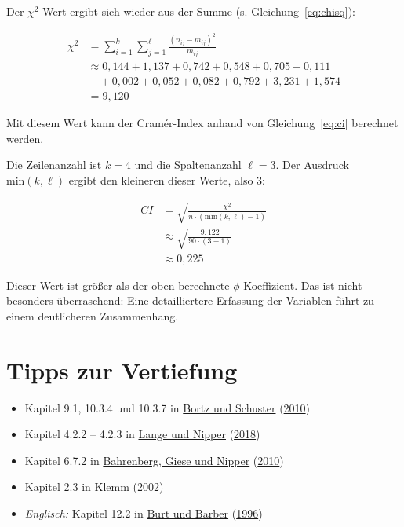 \documentclass[
  11pt,
  ngerman,
  a4paper,
]{report}
\providecommand{\tightlist}{%
  \setlength{\itemsep}{0pt}\setlength{\parskip}{0pt}}
\begin{document}
Der \(\chi^2\)-Wert ergibt sich wieder aus der Summe (s. Gleichung~\eqref{eq:chisq}):

\nopagebreak

\[
\begin{aligned}
\chi^2&= \sum_{i=1}^{k}\sum_{j=1}^{\ell}\frac{(n_{ij}-m_{ij})^{2}}{m_{ij}}\\[4pt]
&\approx 0{,}144+1{,}137+0{,}742+0{,}548+0{,}705+0{,}111\\&\quad+0{,}002+0{,}052+0{,}082+0{,}792+3{,}231+1{,}574 \\
& =9{,}120
\end{aligned}
\]

Mit diesem Wert kann der Cramér-Index anhand von Gleichung~\eqref{eq:ci} berechnet werden.

Die Zeilenanzahl ist \(k=4\) und die Spaltenanzahl \(\ell=3\). Der Ausdruck \(\mathrm{min}(k,\ell)\) ergibt den kleineren dieser Werte, also 3:

\[
\begin{aligned}
\mathit{CI}&=\sqrt{\frac{\chi^2}{n\cdot (\mathrm{min}(k, \ell)-1)}}\\[6pt]
&\approx\sqrt{\frac{9{,}122}{90\cdot(3-1)}}\\[4pt]
&\approx0{,}225
\end{aligned}
\]

Dieser Wert ist größer als der oben berechnete \(\phi\)-Koeffizient. Das ist nicht besonders überraschend: Eine detailliertere Erfassung der Variablen führt zu einem deutlicheren Zusammenhang.

\hypertarget{tipps-zur-vertiefung-8}{%
\section*{Tipps zur Vertiefung}\label{tipps-zur-vertiefung-8}}

\begin{itemize}
\tightlist
\item
  Kapitel 9.1, 10.3.4 und 10.3.7 in \protect\hyperlink{ref-bortz}{Bortz und Schuster} (\protect\hyperlink{ref-bortz}{2010})
\item
  Kapitel 4.2.2 -- 4.2.3 in \protect\hyperlink{ref-delange}{Lange und Nipper} (\protect\hyperlink{ref-delange}{2018})
\item
  Kapitel 6.7.2 in \protect\hyperlink{ref-bahrenberg}{Bahrenberg, Giese und Nipper} (\protect\hyperlink{ref-bahrenberg}{2010})
\item
  Kapitel 2.3 in \protect\hyperlink{ref-klemm}{Klemm} (\protect\hyperlink{ref-klemm}{2002})
\item
  \emph{Englisch:} Kapitel 12.2 in \protect\hyperlink{ref-burt}{Burt und Barber} (\protect\hyperlink{ref-burt}{1996})
\end{itemize}
\end{document}

